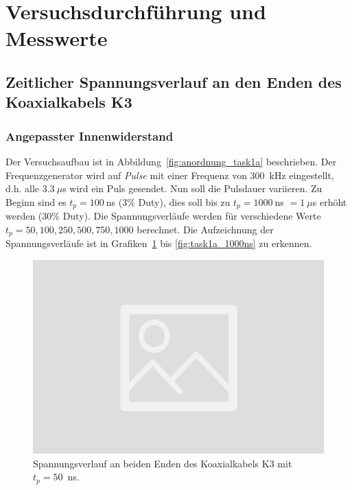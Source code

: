\documentclass{article}
\begin{document}
\section{Versuchsdurchführung und Messwerte}

\subsection{Zeitlicher Spannungsverlauf an den Enden des Koaxialkabels K3}

\subsubsection{Angepasster Innenwiderstand}

Der Versuchsaufbau ist in Abbildung~\ref{fig:anordnung_task1a} beschrieben. Der Frequenzgenerator wird auf \textit{Pulse} mit einer Frequenz von 300~kHz eingestellt, d.h. alle $3.3~\mu$s wird ein Puls gesendet. Nun soll die Pulsdauer variieren. Zu Beginn sind es $t_p=100~$ns (3\% Duty), dies soll bis zu $t_p=1000~$ns $ = 1~\mu$s erhöht werden (30\% Duty). Die Spannungsverläufe werden für verschiedene Werte $t_p = 50, 100, 250, 500, 750, 1000$ berechnet. Die Aufzeichnung der Spannungsverläufe ist in Grafiken~\ref{fig:task1a_50ns} bis \ref{fig:task1a_1000ns} zu erkennen.

\begin{figure}[H]
\centering
\caption{Spannungsverlauf an beiden Enden des Koaxialkabels K3 mit $t_p=50$~ns.}
\label{fig:task1a_50ns}
\includegraphics[scale=0.1]{bilder/task1a/leer.jpg}
\end{figure}
\end{document}
